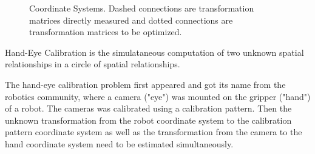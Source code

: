 \documentclass[a4paper]{report}
\begin{document}
\begin{figure}
\caption{Coordinate Systems. Dashed connections are transformation matrices directly measured and dotted connections are transformation matrices to be optimized.}
\label{fig:frame}
\end{figure}

Hand-Eye Calibration is the simulataneous computation of two unknown spatial relationships in a circle of spatial relationships.

The hand-eye calibration problem first appeared and got its name from the robotics community, where a camera ("eye") was mounted on the gripper ("hand") of a robot. The cameras was calibrated using a calibration pattern. Then the unknown transformation from the robot coordinate system to the calibration pattern coordinate system as well as the transformation from the camera to the hand coordinate system need to be estimated simultaneously.
\end{document}
